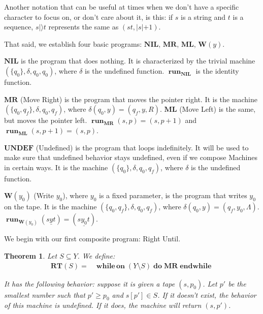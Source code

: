 \documentclass{article}
\newtheorem{theorem}{Theorem}
\DeclareMathOperator{\run}{\mathbf{run}}
\DeclareMathOperator{\Nwhileon}{\mathbf{while\,on}}
\DeclareMathOperator{\Ndo}{\mathbf{do}}
\DeclareMathOperator{\Nendwhile}{\mathbf{endwhile}}
\newcommand{\NIL}{\mathbf{NIL}}
\newcommand{\MR}{\mathbf{MR}}
\newcommand{\ML}{\mathbf{ML}}
\newcommand{\UNDEF}{\mathbf{UNDEF}}
\newcommand{\W}{\mathbf{W}}
\newcommand{\RT}{\mathbf{RT}}
\begin{document}
	Another notation that can be useful at times when we don't have a specific character to focus on, or don't care about it, is this: if $s$ is a string and $t$ is a sequence, $s |\rangle t$ represents the same as $(st, \rvert s \lvert + 1)$.
	
	That said, we establish four basic programs: $\NIL$, $\MR$, $\ML$, $\W(y)$.
	
	$\NIL$ is the program that does nothing. It is characterized by the trivial machine $(\{q_0\}, \delta, q_0, q_0)$, where $\delta$ is the undefined function. $\run_\NIL$ is the identity function.
	
	$\MR$ (Move Right) is the program that moves the pointer right. It is the machine $(\{q_0, q_f\}, \delta, q_0, q_f)$, where $\delta(q_0, y) = (q_f, y, R)$. $\ML$ (Move Left) is the same, but moves the pointer left. $\run_\MR(s,p) = (s, p+1)$ and $\run_\ML(s, p+1) = (s, p)$.
	
	$\UNDEF$ (Undefined) is the program that loops indefinitely. It will be used to make sure that undefined behavior stays undefined, even if we compose Machines in certain ways. It is the machine $(\{q_0\}, \delta, q_0, q_f)$, where $\delta$ is the undefined function.
	
	$\W(y_0)$ (Write $y_0$), where $y_0$ is a fixed parameter, is the program that writes $y_0$ on the tape. It is the machine $(\{q_0, q_f\}, \delta, q_0, q_f)$, where $\delta(q_0, y) = (q_f, y_0, \Lambda)$. $\run_{\W(y_0)}(s \underline y t) = (s \underline{y_0} t)$.
	
	We begin with our first composite program: Right Until.
	
	\begin{theorem}
	Let $S \subseteq Y$. We define:
	\begin{align*}
	\RT(S) =& \Nwhileon (Y \setminus S) \Ndo \MR \Nendwhile
	\end{align*}
	
	It has the following behavior: suppose it is given a tape $(s,p_0)$. Let $p'$ be the smallest number such that $p' \geq p_0$ and $s[p'] \in S$. If it doesn't exist, the behavior of this machine is undefined. If it does, the machine will return $(s,p')$.
	\end{theorem}
	
\end{document}

